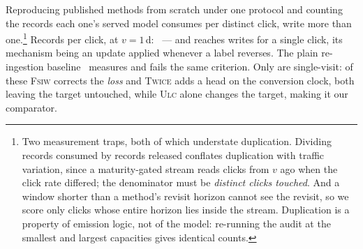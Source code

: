Reproducing \nScreened{} published methods from scratch under one protocol and counting the
records each one's served model consumes per distinct click, \nFail{} write more than
one.\footnote{Two measurement traps, both of which understate duplication. Dividing records
consumed by records released conflates duplication with traffic variation, since a
maturity-gated stream reads clicks from $v$ ago when the click rate differed; the denominator
must be \emph{distinct clicks touched}. And a window shorter than a method's revisit horizon
cannot see the revisit, so we score only clicks whose entire horizon lies inside the stream.
Duplication is a property of emission logic, not of the model: re-running the audit at the
smallest and largest capacities gives identical counts.} Records per click, at $v=1$\,d:
\ --- and \maxVisitsArm{} reaches \maxVisits{} writes for a
single click, its mechanism being an update applied whenever a label reverses. The plain
re-ingestion baseline~\cite{ktena2019addressing,gu2021real} measures \vanillaDup{} and fails
the same criterion. Only \passList{} are single-visit: of these \textsc{Fsiw} corrects the
\emph{loss} and \textsc{Twice} adds a head on the conversion clock, both leaving the target
untouched, while \textsc{Ulc} alone changes the target, making it our comparator.
